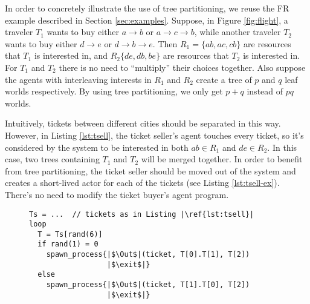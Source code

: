 In order to concretely illustrate the use of tree partitioning, 
we reuse the FR example described in Section \ref{sec:examples}. 
Suppose, in Figure \ref{fig:flight}, a traveler $T_1$ wants to 
buy either $a\to b$ or $a\to c\to b$, while another traveler $T_2$
wants to buy either $d\to e$ or $d\to b\to e$. 
Then $R_1=\{ab,ac,cb\}$ are resources that $T_1$ is interested in, 
and $R_2\{de,db,be\}$ are resources that $T_2$ is interested in. 
For $T_1$ and $T_2$ there is no need to ``multiply'' their choices 
together. Also suppose the agents with interleaving interests in $R_1$ 
and $R_2$ create a tree of $p$ and $q$ leaf worlds respectively. 
By using tree partitioning, we only get $p+q$ instead of $pq$ worlds. 

Intuitively, tickets between different cities should be separated in this way. 
However, in Listing \ref{lst:tsell}, the ticket seller's agent touches 
every ticket, so it's considered by the system to be interested in 
both $ab\in R_1$ and $de\in R_2$. In this case, two trees containing 
$T_1$ and $T_2$ will be merged together. 
In order to benefit from tree partitioning, the ticket seller 
should be moved out of the system and creates a short-lived actor 
for each of the tickets (see Listing \ref{lst:tsell-ex}).
There's no need to modify the ticket buyer's agent program. 

\begin{figure}[tb]
\begin{lstlisting}[label=lst:tsell-ex,caption=Ticket Seller's Program Making Use of Tree Partitioning. {\tt spawn\_process()} creates a short-lived actor for interacting with the system of virtual worlds. {\tt \{...\}} denotes a separate program code instead of evaluation.]
Ts = ...  // tickets as in Listing |\ref{lst:tsell}|
loop
  T = Ts[rand(6)]
  if rand(1) = 0
    spawn_process{|$\Out$|(ticket, T[0].T[1], T[2])
                  |$\exit$|}
  else
    spawn_process{|$\Out$|(ticket, T[1].T[0], T[2])
                  |$\exit$|}
\end{lstlisting}
\end{figure}

